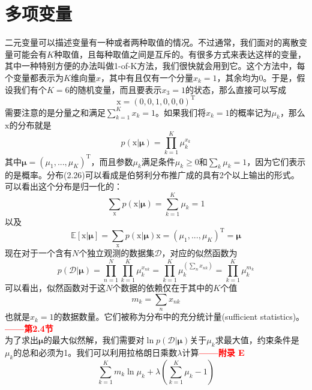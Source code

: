 \documentclass[b5paper]{book}
\numberwithin{equation}{chapter}
\newcommand {\bx} {\boldsymbol{\mathrm{x}}}
\newcommand {\rmT} {\mathrm{T}}
\newcommand {\insertline} {\noindent{\color{red} \rule[5pt]{\textwidth}{0.1em}}}
\begin{document}
	\section{多项变量}
	\insertline
	\textnormal{
	\indent 二元变量可以描述变量有一种或者两种取值的情况。不过通常，我们面对的离散变量可能会有$K$种取值，且每种取值之间是互斥的。有很多方式来表达这样的变量，其中一种特别方便的办法叫做1-of-K方法，我们很快就会用到它。这个方法中，每个变量都表示为$K$维向量$x$，其中有且仅有一个分量$x_k=1$，其余均为0。于是，假设我们有个$K=6$的随机变量，而且要表示$x_3=1$的状态，那么直接可以写成
	\begin{equation}
		\bx=(0,0,1,0,0,0)^{\rmT}
	\end{equation}
	需要注意的是分量之和满足$\sum_{k=1}^K x_k=1$。如果我们将$x_k=1$的概率记为$\mu_k$，那么$\bx$的分布就是
	\begin{equation}
		p(\bx|\boldsymbol{\mu})=\prod_{k=1}^K \mu_k^{x_k}
	\end{equation}
	其中$\boldsymbol{\mu}=(\mu_1,...,\mu_K)^\rmT$，而且参数$\mu_k$满足条件$\mu_k \geqslant 0$和$\sum_k\mu_k=1$，因为它们表示的是概率。分布(2.26)可以看成是伯努利分布推广成的具有2个以上输出的形式。可以看出这个分布是归一化的：
	\begin{equation}
		\sum_{\bx}p(\bx|\boldsymbol{\mu})=\sum_{k=1}^K\mu_k=1
	\end{equation}
	以及
	\begin{equation}
		\mathbb{E}[\bx|\boldsymbol{\mu}]=\sum_{\bx}p(\bx|\boldsymbol{\mu})\bx = (\mu_1,...,\mu_K)^\rmT =\boldsymbol{\mu}
	\end{equation}
	\indent 现在对于一个含有$N$个独立观测的数据集$\mathcal{D}$，对应的似然函数为
	\begin{equation}
		p(\mathcal{D}|\boldsymbol{\mu})=\prod_{n=1}^N\prod_{k=1}^K \mu_k^{x_{nk}}=\prod_{k=1}^K\mu_k^{(\sum_nx_{nk})}=\prod_{k=1}^K \mu_k^{m_k}
	\end{equation}
	可以看出，似然函数对于这$N$个数据的依赖仅在于其中的$K$个值
	\begin{equation}
		m_k=\sum_nx_{nk}
	\end{equation}
	也就是$x_k=1$的数据数量。它们被称为分布中的充分统计量(sufficient statistics)。\textcolor{red}{\textbf{——第2.4节}}\\
	\indent 为了求出$\boldsymbol{\mu}$的最大似然解，我们需要对$\ln p(\mathcal{D}|\boldsymbol{\mu})$关于$\mu_k$求最大值，约束条件是$\mu_k$的总和必须为1。我们可以利用拉格朗日乘数$\lambda$计算\textcolor{red}{\textbf{——附录 E}}
	\begin{equation}
		\sum_{k=1}^Km_k \ln \mu_k + \lambda\left(\sum_{k=1}^K\mu_k-1\right)

\end{equation}}
\end{document}

